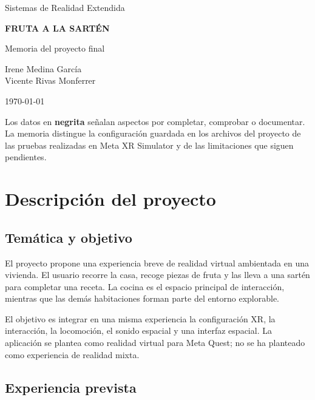 \documentclass[11pt,a4paper]{article}
\begin{document}
\hypersetup{pageanchor=false}
\begin{titlepage}
  \centering
  \vspace*{2cm}
  {\Large Sistemas de Realidad Extendida\par}
  \vspace{2cm}
  {\Huge\bfseries FRUTA A LA SARTÉN\par}
  \vspace{0.7cm}
  {\LARGE Memoria del proyecto final\par}
  \vfill
  {\Large Irene Medina García\\[0.3em]Vicente Rivas Monferrer\par}
  \vspace{1cm}
  {\large \today\par}
  \vfill
  \begin{minipage}{0.9\textwidth}
    \small
    Los datos en \textbf{negrita} señalan aspectos por completar, comprobar o
    documentar. La memoria distingue la configuración guardada en los archivos
    del proyecto de las pruebas realizadas en Meta XR Simulator y de las
    limitaciones que siguen pendientes.
  \end{minipage}
\end{titlepage}
\hypersetup{pageanchor=true}

\tableofcontents
\newpage

\section{Descripción del proyecto}

\subsection{Temática y objetivo}

El proyecto propone una experiencia breve de realidad virtual ambientada en una
vivienda. El usuario recorre la casa, recoge piezas de fruta y las lleva a una
sartén para completar una receta. La cocina es el espacio principal de
interacción, mientras que las demás habitaciones forman parte del entorno
explorable.

El objetivo es integrar en una misma experiencia la configuración XR, la
interacción, la locomoción, el sonido espacial y una interfaz espacial. La
aplicación se plantea como realidad virtual para Meta Quest; no se ha planteado
como experiencia de realidad mixta.

\subsection{Experiencia prevista}
\end{document}
